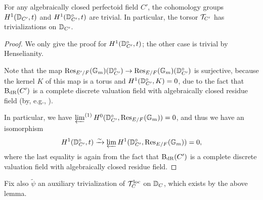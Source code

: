 \begin{lem}\label{lem:cohomvanish}
    For any algebraically closed perfectoid field $C'$, the cohomology groups $H^{1}(\mathbb D_{C'}, t)$ and $H^{1}(\mathbb D_{C'}^{\circ}, t)$ are trivial. In particular, the torsor $\mathcal{T}_{C'}$ has trivializations on $\mathbb D_{C'}$.
\end{lem}

\begin{proof}
    We only give the proof for $H^{1}(\mathbb D_{C'}^{\circ}, t)$; the other case is trivial by Henselianity.
    
    Note that the map $\mathrm{Res}_{E'/F}(\mathbb{G}_{m})(\mathbb D_{C'}^{\circ}) \to \mathrm{Res}_{E/F}(\mathbb{G}_{m})(\mathbb D_{C'}^{\circ})$ is surjective, because the kernel $K$ of this map is a torus and $H^{1}(\mathbb D_{C'}^{\circ}, K) =0$, due to the fact that $\mathrm{B}_{\mathrm{dR}}(C')$ is a complete discrete valuation field with algebraically closed residue field (by, e.g., \cite[\S III.2.3]{Serre94}). 

    In particular, we have $\varprojlim^{(1)} H^{0}(\mathbb D_{C'}^{\circ}, \mathrm{Res}_{E/F}(\mathbb{G}_{m})) =0$, and thus we have an isomorphism
    \begin{equation*}
        H^{1}(\mathbb D_{C'}^{\circ}, t) \xrightarrow{\sim} \varprojlim H^{1}(\mathbb D_{C'}^{\circ}, \mathrm{Res}_{E/F}(\mathbb{G}_{m})) = 0,
    \end{equation*}
    where the last equality is again from the fact that $\mathrm{B}_{\mathrm{dR}}(C')$ is a complete discrete valuation field with algebraically closed residue field. 
\end{proof}

Fix also $\tilde{\psi}$ an auxiliary trivialization of $\mathcal{T}_{C}^{\mathrm{loc}}$ on $\mathbb D_{C}$, which exists by the above lemma.